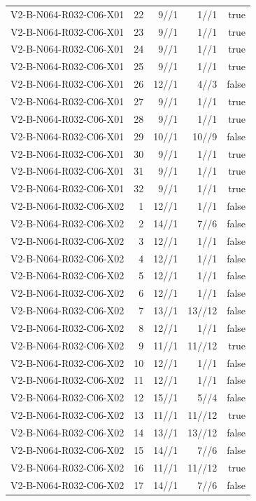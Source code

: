 {\begin{longtable}{lrrrr}
V2-B-N064-R032-C06-X01 & 22 & 9//1 & 1//1 & true \\
V2-B-N064-R032-C06-X01 & 23 & 9//1 & 1//1 & true \\
V2-B-N064-R032-C06-X01 & 24 & 9//1 & 1//1 & true \\
V2-B-N064-R032-C06-X01 & 25 & 9//1 & 1//1 & true \\
V2-B-N064-R032-C06-X01 & 26 & 12//1 & 4//3 & false \\
V2-B-N064-R032-C06-X01 & 27 & 9//1 & 1//1 & true \\
V2-B-N064-R032-C06-X01 & 28 & 9//1 & 1//1 & true \\
V2-B-N064-R032-C06-X01 & 29 & 10//1 & 10//9 & false \\
V2-B-N064-R032-C06-X01 & 30 & 9//1 & 1//1 & true \\
V2-B-N064-R032-C06-X01 & 31 & 9//1 & 1//1 & true \\
V2-B-N064-R032-C06-X01 & 32 & 9//1 & 1//1 & true \\
V2-B-N064-R032-C06-X02 & 1 & 12//1 & 1//1 & false \\
V2-B-N064-R032-C06-X02 & 2 & 14//1 & 7//6 & false \\
V2-B-N064-R032-C06-X02 & 3 & 12//1 & 1//1 & false \\
V2-B-N064-R032-C06-X02 & 4 & 12//1 & 1//1 & false \\
V2-B-N064-R032-C06-X02 & 5 & 12//1 & 1//1 & false \\
V2-B-N064-R032-C06-X02 & 6 & 12//1 & 1//1 & false \\
V2-B-N064-R032-C06-X02 & 7 & 13//1 & 13//12 & false \\
V2-B-N064-R032-C06-X02 & 8 & 12//1 & 1//1 & false \\
V2-B-N064-R032-C06-X02 & 9 & 11//1 & 11//12 & true \\
V2-B-N064-R032-C06-X02 & 10 & 12//1 & 1//1 & false \\
V2-B-N064-R032-C06-X02 & 11 & 12//1 & 1//1 & false \\
V2-B-N064-R032-C06-X02 & 12 & 15//1 & 5//4 & false \\
V2-B-N064-R032-C06-X02 & 13 & 11//1 & 11//12 & true \\
V2-B-N064-R032-C06-X02 & 14 & 13//1 & 13//12 & false \\
V2-B-N064-R032-C06-X02 & 15 & 14//1 & 7//6 & false \\
V2-B-N064-R032-C06-X02 & 16 & 11//1 & 11//12 & true \\
V2-B-N064-R032-C06-X02 & 17 & 14//1 & 7//6 & false \\

\end{longtable}}
